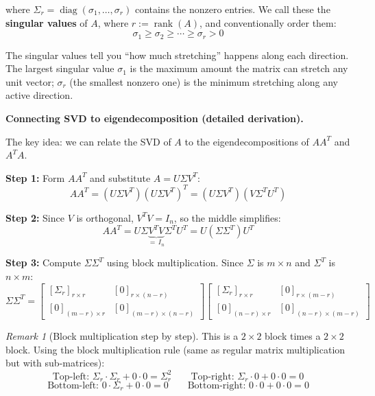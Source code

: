 \documentclass[11pt]{article}
\theoremstyle{definition}
\theoremstyle{plain}
\theoremstyle{remark}
\newtheorem{remark}[definition]{Remark}
\DeclareMathOperator{\rank}{rank}
\DeclareMathOperator{\diag}{diag}
\begin{document}
where $\Sigma_r = \diag(\sigma_1, \ldots, \sigma_r)$ contains the nonzero entries. We call these the \textbf{singular values} of $A$, where $r := \rank(A)$, and conventionally order them:
\[
\sigma_1 \geq \sigma_2 \geq \cdots \geq \sigma_r > 0
\]

\begin{intuitionbox}
The singular values tell you ``how much stretching'' happens along each direction. The largest singular value $\sigma_1$ is the maximum amount the matrix can stretch any unit vector; $\sigma_r$ (the smallest nonzero one) is the minimum stretching along any active direction.
\end{intuitionbox}

\bigskip
\textbf{Connecting SVD to eigendecomposition (detailed derivation).}

The key idea: we can relate the SVD of $A$ to the eigendecompositions of $AA^T$ and $A^T A$.

\textbf{Step 1:} Form $AA^T$ and substitute $A = U\Sigma V^T$:
\[
AA^T = (U\Sigma V^T)(U\Sigma V^T)^T = (U\Sigma V^T)(V \Sigma^T U^T)
\]

\textbf{Step 2:} Since $V$ is orthogonal, $V^T V = I_n$, so the middle simplifies:
\[
AA^T = U\Sigma \underbrace{V^T V}_{=\,I_n} \Sigma^T U^T = U (\Sigma \Sigma^T) U^T
\]

\textbf{Step 3:} Compute $\Sigma \Sigma^T$ using block multiplication. Since $\Sigma$ is $m \times n$ and $\Sigma^T$ is $n \times m$:
\[
\Sigma \Sigma^T = \begin{bmatrix} [\Sigma_r]_{r \times r} & [0]_{r \times (n-r)} \\ [0]_{(m-r) \times r} & [0]_{(m-r) \times (n-r)} \end{bmatrix}
\begin{bmatrix} [\Sigma_r]_{r \times r} & [0]_{r \times (m-r)} \\ [0]_{(n-r) \times r} & [0]_{(n-r) \times (m-r)} \end{bmatrix}
\]

\begin{remark}[Block multiplication step by step]
This is a $2 \times 2$ block times a $2 \times 2$ block. Using the block multiplication rule (same as regular matrix multiplication but with sub-matrices):
\[
\text{Top-left: } \Sigma_r \cdot \Sigma_r + 0 \cdot 0 = \Sigma_r^2 \qquad \text{Top-right: } \Sigma_r \cdot 0 + 0 \cdot 0 = 0
\]
\[
\text{Bottom-left: } 0 \cdot \Sigma_r + 0 \cdot 0 = 0 \qquad \text{Bottom-right: } 0 \cdot 0 + 0 \cdot 0 = 0
\]
\end{remark}
\end{document}
